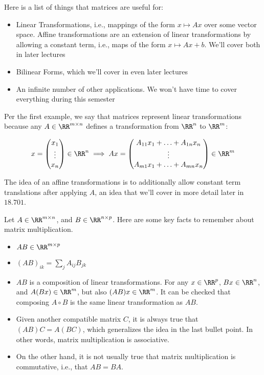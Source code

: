 Here is a list of things that matrices are useful for: 
\begin{itemize}
    \item Linear Transformations, i.e., mappings of the form $x\mapsto Ax$ over some vector space. Affine transformations are an extension of linear transformations by allowing a constant term, i.e., maps of the form $x\mapsto Ax+b$. We'll cover both in later lectures
    \item Bilinear Forms, which we'll cover in even later lectures
    \item An infinite number of other applications. We won't have time to cover everything during this semester
\end{itemize}

Per the first example, we say that matrices represent linear transformations because any $A\in \RR^{m\times n}$ defines a transformation from $\RR^n$ to $\RR^m$:

\[x = \begin{pmatrix}x_1\\ \vdots \\x_n\end{pmatrix}\in \RR^n\implies Ax = \begin{pmatrix}
A_{11}x_1 + \hdots + A_{1n}x_n \\
\vdots \\
A_{m1}x_1 + \hdots + A_{mn}x_n 
\end{pmatrix}\in \RR^{m}\]

The idea of an affine transformations is to additionally allow constant term translations after applying $A$, an idea that we'll cover in more detail later in $18.701$. 

\begin{theorem}
\proplabel

Let $A\in \RR^{m\times n}$, and $B\in \RR^{n\times p}$. Here are some key facts to remember about matrix multiplication.
\end{theorem}

\begin{itemize}
    \item $AB\in \RR^{m\times p}$
    \item $(AB)_{ik} = \sum_j A_{ij}B_{jk}$
    \item $AB$ is a composition of linear transformations. For any $x\in \RR^{p}$, $Bx\in \RR^{n}$, and $A(Bx)\in \RR^{m}$, but also $(AB)x\in \RR^m$. It can be checked that composing $A\circ B$ is the same linear transformation as $AB$. 
    \item Given another compatible matrix $C$, it is always true that $(AB)C = A(BC)$, which generalizes the idea in the last bullet point. In other words, matrix multiplication is associative. 
    \item On the other hand, it is not usually true that matrix multiplication is commutative, i.e., that $AB=BA$. 
\end{itemize}

